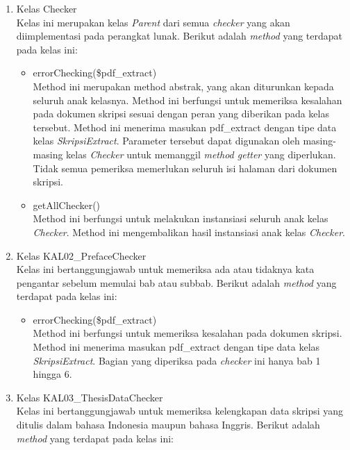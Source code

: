 \begin{enumerate}

	\item Kelas Checker \\
	Kelas ini merupakan kelas \textit{Parent} dari semua \textit{checker} yang akan diimplementasi pada perangkat lunak. Berikut adalah \textit{method} yang terdapat pada kelas ini:
	
		\begin{itemize}
			\item errorChecking(\$pdf\_extract) \\
			Method ini merupakan method abstrak, yang akan diturunkan kepada seluruh anak kelasnya. Method ini berfungsi untuk memeriksa kesalahan pada dokumen skripsi sesuai dengan peran yang diberikan pada kelas tersebut. Method ini menerima masukan pdf\_extract dengan tipe data kelas \textit{SkripsiExtract}. Parameter tersebut dapat digunakan oleh masing-masing kelas \textit{Checker} untuk memanggil \textit{method getter} yang diperlukan. Tidak semua pemeriksa memerlukan seluruh isi halaman dari dokumen skripsi.			
			
			\item getAllChecker() \\
			Method ini berfungsi untuk melakukan instansiasi seluruh anak kelas \textit{Checker}. Method ini mengembalikan hasil instansiasi anak kelas \textit{Checker}.
		\end{itemize}
	
	\item Kelas KAL02\_PrefaceChecker \\
	Kelas ini bertanggungjawab untuk memeriksa ada atau tidaknya kata pengantar sebelum memulai bab atau subbab. Berikut adalah \textit{method} yang terdapat pada kelas ini:
	
		\begin{itemize}
			\item errorChecking(\$pdf\_extract) \\
			Method ini berfungsi untuk memeriksa kesalahan pada dokumen skripsi. Method ini menerima masukan pdf\_extract dengan tipe data kelas \textit{SkripsiExtract}. Bagian yang diperiksa pada \textit{checker} ini hanya bab 1 hingga 6.
		\end{itemize}
	
	\item Kelas KAL03\_ThesisDataChecker \\
	Kelas ini bertanggungjawab untuk memeriksa kelengkapan data skripsi yang ditulis dalam bahasa Indonesia maupun bahasa Inggris. Berikut adalah \textit{method} yang terdapat pada kelas ini:
			

\end{enumerate}
